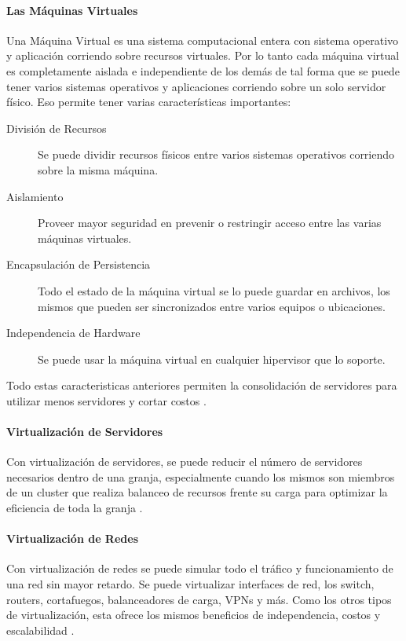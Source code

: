 \paragraph{Las Máquinas Virtuales}
Una Máquina Virtual es una sistema computacional entera con sistema operativo y aplicación corriendo sobre recursos virtuales. Por lo tanto cada máquina virtual es completamente aislada e independiente de los demás de tal forma que se puede tener varios sistemas operativos y aplicaciones corriendo sobre un solo servidor físico. Eso permite tener varias características importantes:
\begin{description}
	\item[División de Recursos] Se puede dividir recursos físicos entre varios sistemas operativos corriendo sobre la misma máquina.
    \item[Aislamiento] Proveer mayor seguridad en prevenir o restringir acceso entre las varias máquinas virtuales.
    \item[Encapsulación de Persistencia] Todo el estado de la máquina virtual se lo puede guardar en archivos, los mismos que pueden ser sincronizados entre varios equipos o ubicaciones.
    \item[Independencia de Hardware] Se puede usar la máquina virtual en cualquier hipervisor que lo soporte.
\end{description}
Todo estas caracteristicas anteriores permiten la consolidación de servidores para utilizar menos servidores y cortar costos \citep{VMWare-Virtualization}.

\paragraph{Virtualización de Servidores}
Con virtualización de servidores, se puede reducir el número de servidores necesarios dentro de una granja, especialmente cuando los mismos son miembros de un cluster que realiza balanceo de recursos frente su carga para optimizar la eficiencia de toda la granja \citep{VMWare-Virtualization}.

\paragraph{Virtualización de Redes}
Con virtualización de redes se puede simular todo el tráfico y funcionamiento de una red sin mayor retardo. Se puede virtualizar interfaces de red, los switch, routers, cortafuegos, balanceadores de carga, VPNs y más. Como los otros tipos de virtualización, esta ofrece los mismos beneficios de independencia, costos y escalabilidad \citep{VMWare-Virtualization}.

